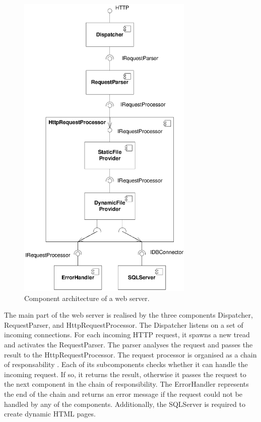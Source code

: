 \begin{figure}[htbp]
\centering
\includegraphics[width=3.3in]{example/WebserverComponents}
\caption{Component architecture of a web server.}
\label{fig:WebserverComponents}
\end{figure}

The main part of the web server is realised by the three components Dispatcher, RequestParser, and HttpRequestProcessor. The Dispatcher listens on a set of incoming connections. For each incoming HTTP request, it spawns a new tread and activates the RequestParser. The parser analyses the request and passes the result to the HttpRequestProcessor. The request processor is organised as a chain of responsability \cite{gamma1995a}. Each of its subcomponents checks whether it can handle the incoming request. If so, it returns the result, otherwise it passes the request to the next component in the chain of responsibility. The ErrorHandler represents the end of the chain and returns an error message if the request could not be handled by any of the components. Additionally, the SQLServer is required to create dynamic HTML pages.


